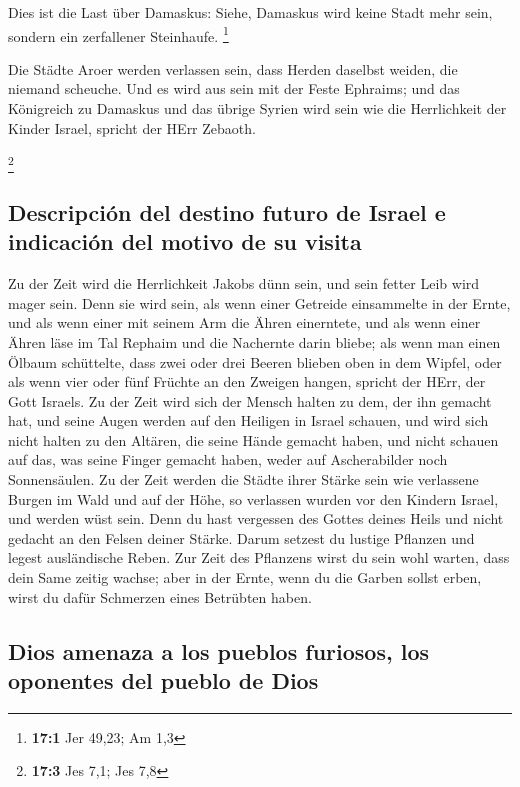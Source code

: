  Dies ist die Last über Damaskus: Siehe, Damaskus wird
keine Stadt mehr sein, sondern ein zerfallener Steinhaufe. \footnote{\textbf{17:1}
  Jer 49,23; Am 1,3}

 Die Städte Aroer werden verlassen sein, dass Herden
daselbst weiden, die niemand scheuche.  Und es wird aus
sein mit der Feste Ephraims; und das Königreich zu Damaskus und das
übrige Syrien wird sein wie die Herrlichkeit der Kinder Israel, spricht
der HErr Zebaoth.

\footnote{\textbf{17:3} Jes 7,1; Jes 7,8}

\hypertarget{descripciuxf3n-del-destino-futuro-de-israel-e-indicaciuxf3n-del-motivo-de-su-visita}{%
\subsection{Descripción del destino futuro de Israel e indicación del
motivo de su
visita}\label{descripciuxf3n-del-destino-futuro-de-israel-e-indicaciuxf3n-del-motivo-de-su-visita}}

 Zu der Zeit wird die Herrlichkeit Jakobs dünn sein, und
sein fetter Leib wird mager sein.  Denn sie wird sein, als
wenn einer Getreide einsammelte in der Ernte, und als wenn einer mit
seinem Arm die Ähren einerntete, und als wenn einer Ähren läse im Tal
Rephaim  und die Nachernte darin bliebe; als wenn man
einen Ölbaum schüttelte, dass zwei oder drei Beeren blieben oben in dem
Wipfel, oder als wenn vier oder fünf Früchte an den Zweigen hangen,
spricht der HErr, der Gott Israels.  Zu der Zeit wird sich
der Mensch halten zu dem, der ihn gemacht hat, und seine Augen werden
auf den Heiligen in Israel schauen,  und wird sich nicht
halten zu den Altären, die seine Hände gemacht haben, und nicht schauen
auf das, was seine Finger gemacht haben, weder auf Ascherabilder noch
Sonnensäulen.  Zu der Zeit werden die Städte ihrer Stärke
sein wie verlassene Burgen im Wald und auf der Höhe, so verlassen wurden
vor den Kindern Israel, und werden wüst sein.  Denn du
hast vergessen des Gottes deines Heils und nicht gedacht an den Felsen
deiner Stärke. Darum setzest du lustige Pflanzen und legest ausländische
Reben.  Zur Zeit des Pflanzens wirst du sein wohl warten,
dass dein Same zeitig wachse; aber in der Ernte, wenn du die Garben
sollst erben, wirst du dafür Schmerzen eines Betrübten haben.

\hypertarget{dios-amenaza-a-los-pueblos-furiosos-los-oponentes-del-pueblo-de-dios}{%
\subsection{Dios amenaza a los pueblos furiosos, los oponentes del
pueblo de
Dios}\label{dios-amenaza-a-los-pueblos-furiosos-los-oponentes-del-pueblo-de-dios}}


